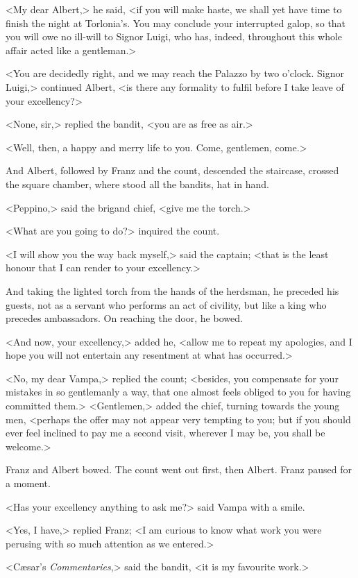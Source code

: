  <My dear Albert,> he said, <if you will make haste, we shall yet have time to finish the night at Torlonia's. You may conclude your interrupted galop, so that you will owe no ill-will to Signor Luigi, who has, indeed, throughout this whole affair acted like a gentleman.> 

 <You are decidedly right, and we may reach the Palazzo by two o'clock. Signor Luigi,> continued Albert, <is there any formality to fulfil before I take leave of your excellency?> 

 <None, sir,> replied the bandit, <you are as free as air.> 

 <Well, then, a happy and merry life to you. Come, gentlemen, come.> 

 And Albert, followed by Franz and the count, descended the staircase, crossed the square chamber, where stood all the bandits, hat in hand. 

 <Peppino,> said the brigand chief, <give me the torch.> 

 <What are you going to do?> inquired the count. 

 <I will show you the way back myself,> said the captain; <that is the least honour that I can render to your excellency.> 

 And taking the lighted torch from the hands of the herdsman, he preceded his guests, not as a servant who performs an act of civility, but like a king who precedes ambassadors. On reaching the door, he bowed. 

 <And now, your excellency,> added he, <allow me to repeat my apologies, and I hope you will not entertain any resentment at what has occurred.> 

 <No, my dear Vampa,> replied the count; <besides, you compensate for your mistakes in so gentlemanly a way, that one almost feels obliged to you for having committed them.>  <Gentlemen,> added the chief, turning towards the young men, <perhaps the offer may not appear very tempting to you; but if you should ever feel inclined to pay me a second visit, wherever I may be, you shall be welcome.> 

 Franz and Albert bowed. The count went out first, then Albert. Franz paused for a moment. 

 <Has your excellency anything to ask me?> said Vampa with a smile. 

 <Yes, I have,> replied Franz; <I am curious to know what work you were perusing with so much attention as we entered.> 

 <Cæsar's \textit{Commentaries},> said the bandit, <it is my favourite work.> 


